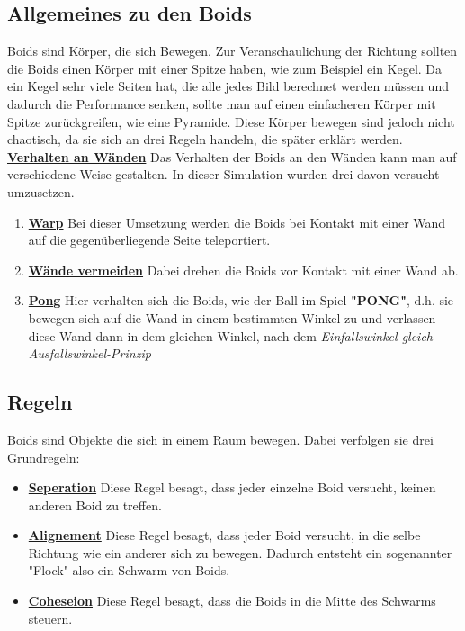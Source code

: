 \documentclass[a4paper, 12pt]{article}
\begin{document}
	\subsection{Allgemeines zu den Boids}
		Boids sind Körper, die sich Bewegen. Zur Veranschaulichung der Richtung sollten die Boids einen Körper mit einer Spitze haben, wie zum Beispiel ein Kegel. Da ein Kegel sehr viele Seiten hat, die alle jedes Bild berechnet werden müssen und dadurch die Performance senken, sollte man auf einen einfacheren Körper mit Spitze zurückgreifen, wie eine Pyramide.  Diese Körper bewegen sind jedoch nicht chaotisch, da sie sich an drei Regeln handeln, die später erklärt werden.\linebreak
		\newpage
		\textbf{\underline{Verhalten an Wänden}}
		Das Verhalten der Boids an den Wänden kann man auf verschiedene Weise gestalten. In dieser Simulation wurden drei davon versucht umzusetzen. 
		\begin{enumerate}
			\item \underline{\textbf{Warp}}\linebreak
			Bei dieser Umsetzung werden die Boids bei Kontakt mit einer Wand auf die gegenüberliegende Seite teleportiert.
			
			\item \underline{\textbf{Wände vermeiden}}\linebreak
			Dabei drehen die Boids vor Kontakt mit einer Wand ab.
			
			\item \underline{\textbf{Pong}}\linebreak
			Hier verhalten sich die Boids, wie der Ball im Spiel \textbf{"PONG"}, d.h. sie bewegen sich auf die Wand in einem bestimmten Winkel zu und verlassen diese Wand dann in dem gleichen Winkel, nach dem \emph{Einfallswinkel-gleich-Ausfallswinkel-Prinzip}
		\end{enumerate}

	\subsection{Regeln}
	Boids sind Objekte die sich in einem Raum bewegen. Dabei verfolgen sie drei Grundregeln:
	\begin{itemize}
		\item\textbf{\underline{Seperation}}\linebreak
		Diese Regel besagt, dass jeder einzelne Boid versucht, keinen anderen Boid zu treffen. 
		\item\textbf{\underline{Alignement}}\linebreak
		Diese Regel besagt, dass jeder Boid versucht, in die selbe Richtung wie ein anderer sich zu bewegen. Dadurch entsteht ein sogenannter "Flock" also ein Schwarm von Boids.
		\item\textbf{\underline{Coheseion}}\linebreak
		Diese Regel besagt, dass die Boids in die Mitte des Schwarms steuern.
	\end{itemize}
	
\end{document}
